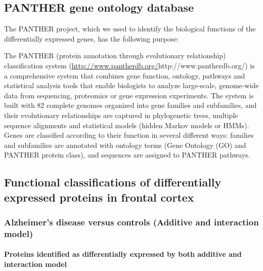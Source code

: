 \subsection{PANTHER gene ontology database}
\label{subsec:panth-gene-ontol}

The PANTHER project, which we used to identify the biological functions of the differentially expressed genes, has the following purpose\cite{PANTHER}:\\

\begin{blockquote}
  The PANTHER (protein annotation through evolutionary relationship) classification system (\url{http://www.pantherdb.org/}{http://www.pantherdb.org/}) is a comprehensive system that combines gene function, ontology, pathways and statistical analysis tools that enable biologists to analyze large-scale, genome-wide data from sequencing, proteomics or gene expression experiments. The system is built with 82 complete genomes organized into gene families and subfamilies, and their evolutionary relationships are captured in phylogenetic trees, multiple sequence alignments and statistical models (hidden Markov models or HMMs). Genes are classified according to their function in several different ways: families and subfamilies are annotated with ontology terms (Gene Ontology (GO) and PANTHER protein class), and sequences are assigned to PANTHER pathways.
\end{blockquote}

\subsection{Functional classifications of differentially expressed proteins in frontal cortex}
\label{subsec:funct-class-diff}

\subsubsection{Alzheimer's disease versus controls (Additive and interaction model)}
\label{sec:prot-ident-alzh}

\paragraph{Proteins identified as differentially expressed by both additive and interaction model}


